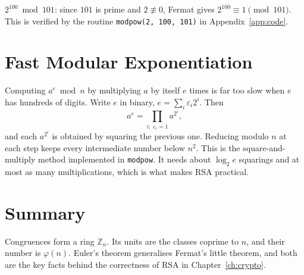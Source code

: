 \begin{example}
$2^{100}\bmod 101$: since $101$ is prime and $2\not\equiv 0$, Fermat gives $2^{100}\equiv 1\pmod{101}$. This is verified by the routine \texttt{modpow(2, 100, 101)} in Appendix~\ref{app:code}.
\end{example}

\section{Fast Modular Exponentiation}

Computing $a^e\bmod n$ by multiplying $a$ by itself $e$ times is far too slow when $e$ has hundreds of digits. Write $e$ in binary, $e=\sum_i \varepsilon_i 2^i$. Then
\[
  a^{e} = \prod_{i:\ \varepsilon_i=1} a^{2^i},
\]
and each $a^{2^i}$ is obtained by squaring the previous one. Reducing modulo $n$ at each step keeps every intermediate number below $n^2$. This is the square-and-multiply method implemented in \texttt{modpow}. It needs about $\log_2 e$ squarings and at most as many multiplications, which is what makes RSA practical.

\section{Summary}

Congruences form a ring $\mathbb{Z}_n$. Its units are the classes coprime to $n$, and their number is $\varphi(n)$. Euler's theorem generalises Fermat's little theorem, and both are the key facts behind the correctness of RSA in Chapter~\ref{ch:crypto}.
